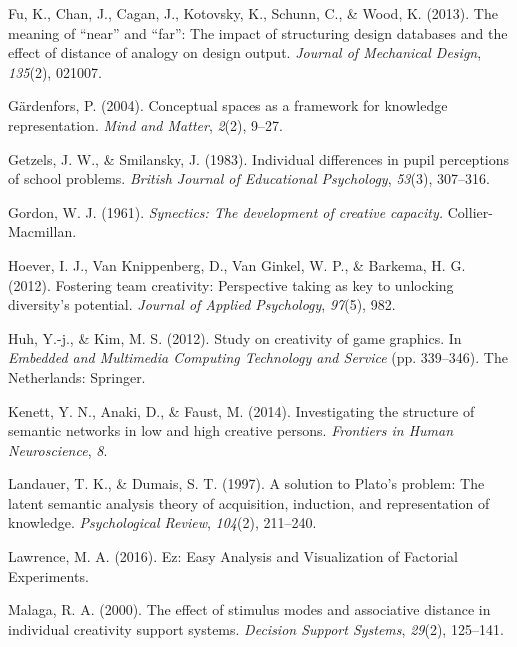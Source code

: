 \documentclass[english,man]{apa6}
\begin{document}
\leavevmode\hypertarget{ref-fu2013meaning}{}%
Fu, K., Chan, J., Cagan, J., Kotovsky, K., Schunn, C., \& Wood, K.
(2013). The meaning of ``near'' and ``far'': The impact of structuring
design databases and the effect of distance of analogy on design output.
\emph{Journal of Mechanical Design}, \emph{135}(2), 021007.

\leavevmode\hypertarget{ref-GardenforsConceptualspacesframework2004}{}%
Gärdenfors, P. (2004). Conceptual spaces as a framework for knowledge
representation. \emph{Mind and Matter}, \emph{2}(2), 9--27.

\leavevmode\hypertarget{ref-getzels_individual_1983}{}%
Getzels, J. W., \& Smilansky, J. (1983). Individual differences in pupil
perceptions of school problems. \emph{British Journal of Educational
Psychology}, \emph{53}(3), 307--316.

\leavevmode\hypertarget{ref-gordon1961synectics}{}%
Gordon, W. J. (1961). \emph{Synectics: The development of creative
capacity.} Collier-Macmillan.

\leavevmode\hypertarget{ref-hoever2012fostering}{}%
Hoever, I. J., Van Knippenberg, D., Van Ginkel, W. P., \& Barkema, H. G.
(2012). Fostering team creativity: Perspective taking as key to
unlocking diversity's potential. \emph{Journal of Applied Psychology},
\emph{97}(5), 982.

\leavevmode\hypertarget{ref-huh2012study}{}%
Huh, Y.-j., \& Kim, M. S. (2012). Study on creativity of game graphics.
In \emph{Embedded and Multimedia Computing Technology and Service} (pp.
339--346). The Netherlands: Springer.

\leavevmode\hypertarget{ref-kenett2014investigating}{}%
Kenett, Y. N., Anaki, D., \& Faust, M. (2014). Investigating the
structure of semantic networks in low and high creative persons.
\emph{Frontiers in Human Neuroscience}, \emph{8}.

\leavevmode\hypertarget{ref-landauer1997solution}{}%
Landauer, T. K., \& Dumais, S. T. (1997). A solution to Plato's problem:
The latent semantic analysis theory of acquisition, induction, and
representation of knowledge. \emph{Psychological Review}, \emph{104}(2),
211--240.

\leavevmode\hypertarget{ref-LawrenceezEasyAnalysis2016}{}%
Lawrence, M. A. (2016). Ez: Easy Analysis and Visualization of Factorial
Experiments.

\leavevmode\hypertarget{ref-malaga2000effect}{}%
Malaga, R. A. (2000). The effect of stimulus modes and associative
distance in individual creativity support systems. \emph{Decision
Support Systems}, \emph{29}(2), 125--141.
\end{document}
